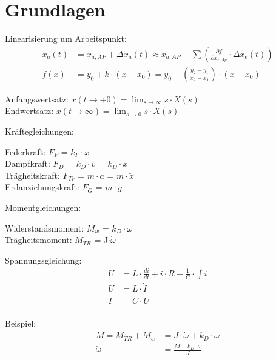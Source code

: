 \section{Grundlagen}
Linearisierung um Arbeitspunkt:
\begin{align*}
	x_{a}(t) &= x_{a,AP}+\Delta x_{a}(t) \approx x_{a,AP}+\sum\left(\frac{\partial f}{\partial x_{e,Ap}} \cdot \Delta x_{e}(t)\right)\\
	f(x) &= y_0 + k \cdot (x - x_0) = y_0 + \left(\frac{y_2 - y_1}{x_2 - x_1}\right) \cdot (x - x_0)
\end{align*}

\begin{mdframed}[style=exercise]
	Anfangswertsatz: $x(t \rightarrow +0)=\lim _{s \rightarrow \infty} s \cdot X(s)$\\
	Endwertsatz: $x(t \rightarrow \infty)=\lim _{s \rightarrow 0} s \cdot X(s)$
\end{mdframed}

Kräftegleichungen:
\begin{mdframed}[style=exercise]
	Federkraft: $F_F$ = $k_F \cdot x$\\
	Dampfkraft: $F_D$ = $k_D \cdot v$ = $k_D \cdot \dot{x}$\\
	Trägheitskraft: $F_{Tr}$ = $m\cdot a$ = $m\cdot \ddot{x}$\\
	Erdanziehungskraft: $F_G$ = $m\cdot g$
\end{mdframed}

Momentgleichungen:
\begin{mdframed}[style=exercise]
	Widerstandsmoment: $M_w$ = $k_D \cdot \omega$\\
	Trägheitsmoment: $M_{TR}$ = J$\cdot \dot{\omega}$
\end{mdframed}

Spannungsgleichung:
\begin{align*}
	U &= L\cdot \frac{di}{dt}+i\cdot R+\frac{1}{C} \cdot \int i	\\
	U &= L \cdot \dot{I} \\
	I &= C \cdot \dot{U} \\
\end{align*}

Beispiel:
\begin{align*}
	M = M_{TR}+M_w &= J \cdot \dot{\omega} +k_D \cdot \omega \\
	\dot{\omega} &= \frac{M - k_D \cdot \omega}{J}
\end{align*}